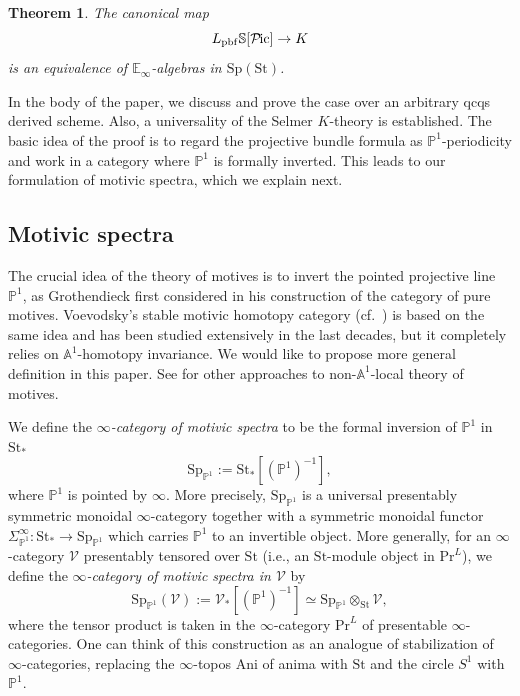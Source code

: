 \documentclass{amsart}
\theoremstyle{plain}
\newtheorem{theorem}{Theorem}[subsection]
\theoremstyle{definition}
\theoremstyle{remark}
\numberwithin{equation}{theorem}
\newcommand{\mbb}[1]{\mathbb{#1}}
\newcommand{\Ani}{\mathrm{Ani}}
\renewcommand{\Pr}{\mathrm{Pr}}
\newcommand{\Sp}{\mathrm{Sp}}
\newcommand{\St}{\mathrm{St}}
\newcommand{\V}{\mathcal{V}}
\newcommand{\pbf}{\mathrm{pbf}}
\newcommand{\SigmaP}{\Sigma_{\mathbb{P}^1}}
\newcommand{\SpP}{\mathrm{Sp}_{\mathbb{P}^1}}
\newcommand{\Pic}{{\mathcal{P}\mspace{-2.0mu}\mathrm{ic}}}
\begin{document}
\begin{theorem}\label{thm1}
The canonical map
\[
	L_\pbf\mbb{S}[\Pic] \to K
\]
is an equivalence of $\mbb{E}_\infty$-algebras in $\Sp(\St)$.
\end{theorem}

In the body of the paper, we discuss and prove the case over an arbitrary qcqs derived scheme.
Also, a universality of the Selmer $K$-theory is established.
The basic idea of the proof is to regard the projective bundle formula as $\mbb{P}^1$-periodicity and work in a category where $\mbb{P}^1$ is formally inverted.
This leads to our formulation of motivic spectra, which we explain next.


\subsection{Motivic spectra}

The crucial idea of the theory of motives is to invert the pointed projective line $\mbb{P}^1$, as Grothendieck first considered in his construction of the category of pure motives.
Voevodsky's stable motivic homotopy category (cf.\ \cite{Vo,MV}) is based on the same idea and has been studied extensively in the last decades, but it completely relies on $\mbb{A}^1$-homotopy invariance.
We would like to propose more general definition in this paper.
See \cite{Bin,BDO,KMSY} for other approaches to non-$\mbb{A}^1$-local theory of motives.

We define the \textit{$\infty$-category of motivic spectra} to be the formal inversion of $\mbb{P}^1$ in $\St_*$
\[
	\SpP := \St_*[(\mbb{P}^1)^{-1}],
\]
where $\mbb{P}^1$ is pointed by $\infty$.
More precisely, $\SpP$ is a universal presentably symmetric monoidal $\infty$-category together with a symmetric monoidal functor $\SigmaP^\infty\colon\St_*\to\SpP$ which carries $\mbb{P}^1$ to an invertible object.
More generally, for an $\infty$-category $\V$ presentably tensored over $\St$ (i.e., an $\St$-module object in $\Pr^L$), we define the \textit{$\infty$-category of motivic spectra in $\V$} by
\[
	\SpP(\V) := \V_*[(\mbb{P}^1)^{-1}] \simeq \SpP\otimes_\St\V,
\]
where the tensor product is taken in the $\infty$-category $\Pr^L$ of presentable $\infty$-categories.
One can think of this construction as an analogue of stabilization of $\infty$-categories, replacing the $\infty$-topos $\Ani$ of anima with $\St$ and the circle $S^1$ with $\mbb{P}^1$.
\end{document}
